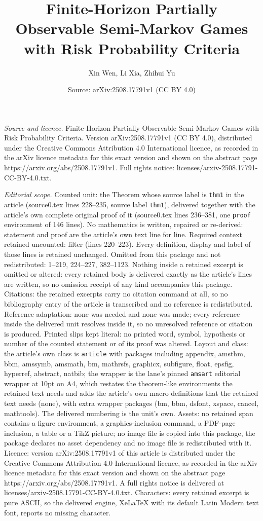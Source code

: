 \documentclass[10pt,a4paper]{amsart}
\title[Finite-Horizon Partially Observable Semi-Markov Games with R]{Finite-Horizon Partially Observable Semi-Markov Games with Risk Probability Criteria}
\author{Xin Wen, Li Xia, Zhihui Yu}
\date{Source: arXiv:2508.17791v1 (CC BY 4.0)}
\begin{document}
\maketitle

\noindent\emph{Source and licence.} Finite-Horizon Partially Observable Semi-Markov Games with Risk Probability Criteria. Version arXiv:2508.17791v1 (CC BY 4.0), distributed under the Creative Commons Attribution 4.0 International licence, as recorded in the arXiv licence metadata for this exact version and shown on the abstract page https://arxiv.org/abs/2508.17791v1. Full rights notice: licenses/arxiv-2508.17791-CC-BY-4.0.txt.\par\smallskip

\noindent\textit{Editorial scope.} Counted unit: the Theorem whose source label is \texttt{thm1} in the article (source0.tex lines 228--235, source label \texttt{thm1}), delivered together with the article's own complete original proof of it (source0.tex lines 236--381, one \texttt{proof} environment of 146 lines). No mathematics is written, repaired or re-derived: statement and proof are the article's own text line for line. Required context retained uncounted: filter (lines 220--223). Every definition, display and label of those lines is retained unchanged. Omitted from this package and not redistributed: 1--219, 224--227, 382--1123. Nothing inside a retained excerpt is omitted or altered: every retained body is delivered exactly as the article's lines are written, so no omission receipt of any kind accompanies this package. Citations: the retained excerpts carry no citation command at all, so no bibliography entry of the article is transcribed and no reference is redistributed. Reference adaptation: none was needed and none was made; every reference inside the delivered unit resolves inside it, so no unresolved reference or citation is produced. Printed slips kept literal: no printed word, symbol, hypothesis or number of the counted statement or of its proof was altered. Layout and class: the article's own class is \texttt{article} with packages including appendix, amsthm, bbm, amssymb, amsmath, bm, mathrsfs, graphicx, subfigure, float, epsfig, hyperref, abstract, natbib; the wrapper is the lane's pinned \texttt{amsart} editorial wrapper at 10pt on A4, which restates the theorem-like environments the retained text needs and adds the article's own macro definitions that the retained text needs (none), with extra wrapper packages (bm, bbm, dsfont, xspace, cancel, mathtools). The delivered numbering is the unit's own. Assets: no retained span contains a figure environment, a graphics-inclusion command, a PDF-page inclusion, a table or a TikZ picture; no image file is copied into this package, the package declares no asset dependency and no image file is redistributed with it. Licence: version arXiv:2508.17791v1 of this article is distributed under the Creative Commons Attribution 4.0 International licence, as recorded in the arXiv licence metadata for this exact version and shown on the abstract page https://arxiv.org/abs/2508.17791v1. A full rights notice is delivered at licenses/arxiv-2508.17791-CC-BY-4.0.txt. Characters: every retained excerpt is pure ASCII, so the delivered engine, XeLaTeX with its default Latin Modern text font, reports no missing character.
\end{document}
